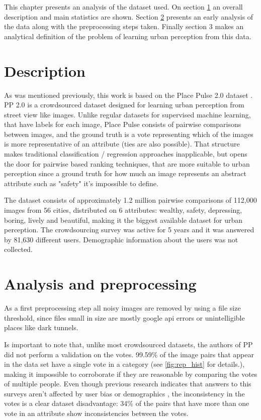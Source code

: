 This chapter presents an analysis of the dataset used. On section \ref{sec:dataset_desc} an overall description
and main statistics are shown. Section \ref{sec:dataset_prep} presents an early analysis of the data along with
the preprocessing steps taken. Finally section 3 makes an analytical definition of the problem
of learning urban perception from this data.


\section{Description}
\label{sec:dataset_desc}
As was mentioned previously, this work is based on the Place Pulse 2.0 dataset \cite{hidalgo_placepulse}.
PP 2.0 is a crowdsourced dataset designed for learning urban perception from street view like images.
Unlike regular datasets for supervised machine learning, that have labels for each image, Place Pulse
consists of pairwise comparisons between images, and the ground truth is a vote representing which of
the images is more representative of an attribute (ties are also possible). That structure makes
traditional classification / regression approaches inapplicable, but opens the door for
pairwise based ranking techniques, that are more suitable to urban perception since a ground truth for
how much an image represents an abstract attribute such as "safety" it's impossible to define.

The dataset consists of approximately 1.2 million pairwise comparisons of 112,000 images from 56 cities,
distributed on 6 attributes: wealthy, safety, depressing, boring, lively and beautiful, making it
the biggest available dataset for urban perception. The crowdsourcing survey was
active for 5 years and it was answered by 81,630 different users. Demographic information
about the users was not collected.

\section{Analysis and preprocessing}
\label{sec:dataset_prep}

As a first preprocessing step all noisy images are removed by using a file size threshold,
since files small in size are mostly  google api errors or unintelligible places like
dark tunnels.

Is important to note that, unlike most crowdsourced datasets, the authors of PP did not
perform a validation on the votes. 99.59\% of the image pairs that appear in the
data set have a single vote in a category (see \ref{fig:rep_hist} for details.),
making it impossible to corroborate if they are reasonable by comparing the votes of multiple people.
Even though previous research indicates that answers to this surveys aren't affected by user
bias or demographics \cite{hidalgo_inequality, costa_lisbon}, the inconsistency in the votes is a
clear dataset disadvantage: 34\% of the  pairs that have more than one vote in an attribute
show inconsistencies between the votes.


